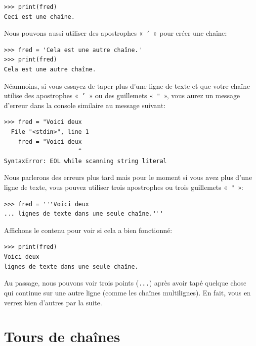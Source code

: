 \begin{Verbatim}[frame=single,rulecolor=\color{mbleu}, label=à taper]
>>> print(fred)
Ceci est une chaîne.
\end{Verbatim}

Nous pouvons aussi utiliser des apostrophes «~\texttt{'}~» pour créer une chaîne:

\begin{Verbatim}[frame=single,rulecolor=\color{mbleu}, label=à taper]
>>> fred = 'Cela est une autre chaîne.'
>>> print(fred)
Cela est une autre chaîne.
\end{Verbatim}

Néanmoins, si vous essayez de taper plus d'une ligne de texte et que votre chaîne utilise des apostrophes «~\texttt{'}~» ou des guillemets «~\texttt{"}~», vous aurez un message d'erreur dans la console similaire au message suivant:

\begin{Verbatim}[frame=single,rulecolor=\color{red}, label=erreur]
>>> fred = "Voici deux
  File "<stdin>", line 1
    fred = "Voici deux
                     ^
SyntaxError: EOL while scanning string literal
\end{Verbatim}

Nous parlerons des erreurs plus tard mais pour le moment si vous avez plus d'une ligne de texte,
vous pouvez utiliser trois apostrophes ou trois guillemets  «~\texttt{"}~»:

\begin{Verbatim}[frame=single,rulecolor=\color{mbleu}, label=à taper]
>>> fred = '''Voici deux
... lignes de texte dans une seule chaîne.'''
\end{Verbatim}

Affichons le contenu pour voir si cela a bien fonctionné:

\begin{Verbatim}[frame=single,rulecolor=\color{mbleu}, label=à taper]
>>> print(fred)
Voici deux
lignes de texte dans une seule chaîne.
\end{Verbatim}

Au passage, nous pouvons voir trois points (\verb+...+)  après avoir tapé quelque chose qui continue sur une autre ligne (comme les chaînes multilignes). En fait, vous en verrez bien d'autres par la suite.

\section{Tours de chaînes\label{sec:tours}}

